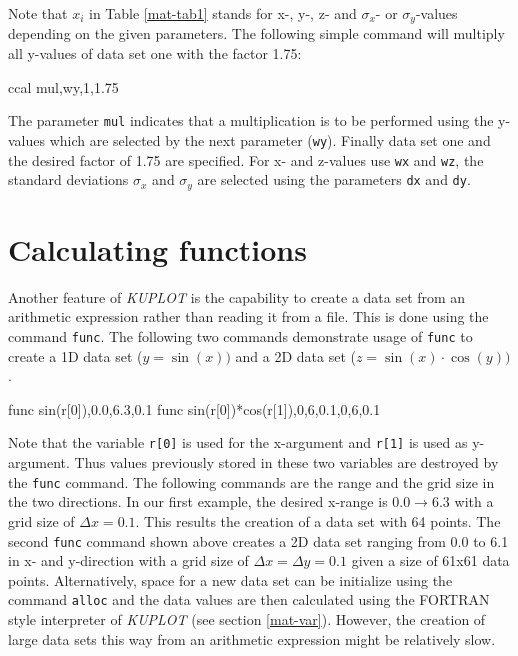 Note that $x_{i}$ in Table \ref{mat-tab1} stands for x-, y-, z- and
$\sigma_{x}$- or $\sigma_{y}$-values depending on the given parameters.
The following simple command will multiply all y-values of data set one
with the factor 1.75:
%
\begin{MacVerbatim}
     ccal mul,wy,1,1.75
\end{MacVerbatim}
%
The parameter {\tt mul} indicates that a multiplication is to be
performed using the y-values which are selected by the next
parameter ({\tt wy}). Finally data set one and the desired factor of
1.75 are specified. For x- and z-values use {\tt wx} and {\tt wz},
the standard deviations $\sigma_{x}$ and $\sigma_{y}$ are selected
using the parameters {\tt dx} and {\tt dy}.


\section{Calculating functions \label{mat-func}}

Another feature of {\it KUPLOT} is the capability to create a data
set from an arithmetic expression rather than reading it from a
file. This is done using the command {\tt func}. The following two
commands demonstrate usage of {\tt func} to create a 1D data set ($y
= \sin(x))$ and a 2D data set ($z = \sin(x) \cdot \cos(y))$.
%
\begin{MacVerbatim}
   func sin(r[0]),0.0,6.3,0.1
   func sin(r[0])*cos(r[1]),0,6,0.1,0,6,0.1
\end{MacVerbatim}
%
Note that the variable {\tt r[0]} is used for the x-argument and
{\tt r[1]} is used as y-argument. Thus values previously stored in
these two variables are destroyed by the {\tt func} command. The
following commands are the range and the grid size in the two
directions. In our first example, the desired x-range is $0.0
\rightarrow 6.3$ with a grid size of $\Delta x = 0.1$. This results
the creation of a data set with 64 points. The second {\tt func}
command shown above creates a 2D data set ranging from 0.0 to 6.1 in
x- and y-direction with a grid size of $\Delta x = \Delta y = 0.1$
given a size of 61x61 data points. Alternatively, space for a new
data set can be initialize using the command {\tt alloc} and the
data values are then calculated using the FORTRAN style interpreter
of {\it KUPLOT} (see section \ref{mat-var}). However,  the creation
of large data sets this way from an arithmetic expression might be
relatively slow. \par

